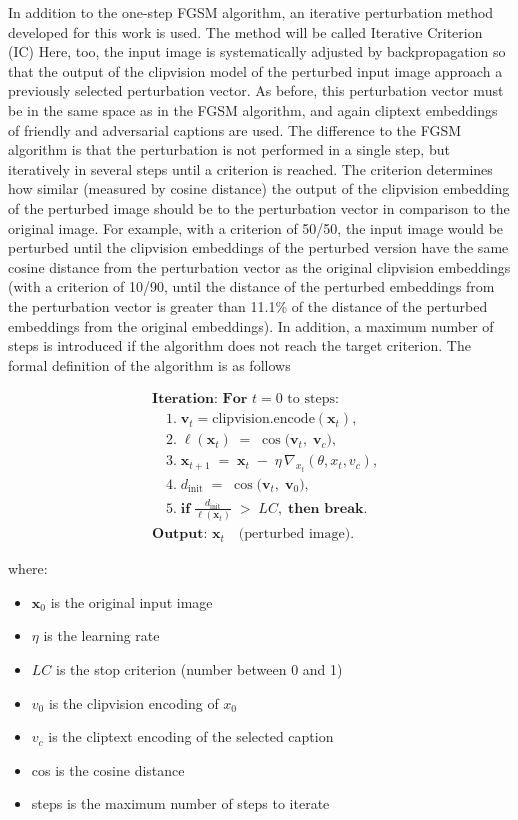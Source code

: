 In addition to the one-step FGSM algorithm, an iterative perturbation method developed for this work is used. The method will be called Iterative Criterion (IC) Here, too, the input image is systematically adjusted by backpropagation so that the output of the clipvision model of the perturbed input image approach a previously selected perturbation vector. As before, this perturbation vector must be in the same space as in the FGSM algorithm, and again cliptext embeddings of friendly and adversarial captions are used. The difference to the FGSM algorithm is that the perturbation is not performed in a single step, but iteratively in several steps until a criterion is reached. The criterion determines how similar (measured by cosine distance) the output of the clipvision embedding of the perturbed image should be to the perturbation vector in comparison to the original image. For example, with a criterion of 50/50, the input image would be perturbed until the clipvision embeddings of the perturbed version have the same cosine distance from the perturbation vector as the original clipvision embeddings (with a criterion of 10/90, until the distance of the perturbed embeddings from the perturbation vector is greater than 11.1\% of the distance of the perturbed embeddings from the original embeddings). In addition, a maximum number of steps is introduced if the algorithm does not reach the target criterion. The formal definition of the algorithm is as follows 

\[
\begin{aligned}
& \textbf{Iteration: For } t = 0 \text{ to steps:}\\
& \quad 1.\; \mathbf{v}_t = \mathrm{clipvision.encode}(\mathbf{x}_t), \\[4pt]
& \quad 2.\; \ell(\mathbf{x}_t) 
\;=\; \cos\bigl(\mathbf{v}_t,\;\mathbf{v}_c\bigr), \\[4pt]
& \quad 3.\; \mathbf{x}_{t+1} 
\;=\; \mathbf{x}_t \;-\; \eta \,\nabla_{x_t} (\theta, x_t, v_c), \\[4pt]
& \quad 4.\; d_{\text{init}} 
\;=\; \cos\bigl(\mathbf{v}_t,\;\mathbf{v}_0\bigr), \\[4pt]
& \quad 5.\; \textbf{if} \;\frac{d_{\text{init}}}{\ell(\mathbf{x}_t)} 
\;>\; LC, \;\textbf{then break}.\\[6pt]
%
& \textbf{Output: } \mathbf{x}_t \quad \text{(perturbed image)}.
\end{aligned}
\]

where:
\begin{itemize}
    \item $\mathbf{x}_0$ is the original input image
    \item $\eta$ is the learning rate
    \item $LC$ is the stop criterion (number between 0 and 1)
    \item $v_0$ is the clipvision encoding of $x_0$
    \item $v_c$ is the cliptext encoding of the selected caption
    \item cos is the cosine distance
    \item steps is the maximum number of steps to iterate
\end{itemize}

